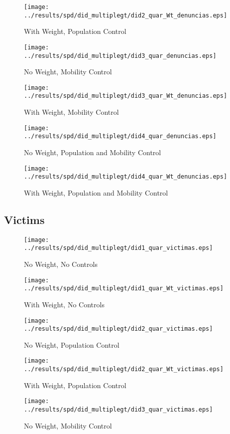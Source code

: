 \documentclass[11pt,letterpaper]{article}
\begin{document}
\begin{figure}[H]
\caption{With Weight, Population Control}
\centering
\texttt{[image: ../results/spd/did\_multiplegt/did2\_quar\_Wt\_denuncias.eps]}
\end{figure}
\begin{figure}[H]
\caption{No Weight, Mobility Control}
\centering
\texttt{[image: ../results/spd/did\_multiplegt/did3\_quar\_denuncias.eps]}
\end{figure}

\begin{figure}[H]
\caption{With Weight, Mobility Control}
\centering
\texttt{[image: ../results/spd/did\_multiplegt/did3\_quar\_Wt\_denuncias.eps]}
\end{figure}
\begin{figure}[H]
\caption{No Weight, Population and Mobility Control}
\centering
\texttt{[image: ../results/spd/did\_multiplegt/did4\_quar\_denuncias.eps]}
\end{figure}

\begin{figure}[H]
\caption{With Weight, Population and Mobility Control}
\centering
\texttt{[image: ../results/spd/did\_multiplegt/did4\_quar\_Wt\_denuncias.eps]}
\end{figure}

	\subsection{Victims}
\begin{figure}[H]
\caption{No Weight, No Controls}
\centering
\texttt{[image: ../results/spd/did\_multiplegt/did1\_quar\_victimas.eps]}
\end{figure}

\begin{figure}[H]
\caption{With Weight, No Controls}
\centering
\texttt{[image: ../results/spd/did\_multiplegt/did1\_quar\_Wt\_victimas.eps]}
\end{figure}
\begin{figure}[H]
\caption{No Weight, Population Control}
\centering
\texttt{[image: ../results/spd/did\_multiplegt/did2\_quar\_victimas.eps]}
\end{figure}

\begin{figure}[H]
\caption{With Weight, Population Control}
\centering
\texttt{[image: ../results/spd/did\_multiplegt/did2\_quar\_Wt\_victimas.eps]}
\end{figure}
\begin{figure}[H]
\caption{No Weight, Mobility Control}
\centering
\texttt{[image: ../results/spd/did\_multiplegt/did3\_quar\_victimas.eps]}
\end{figure}
\end{document}
